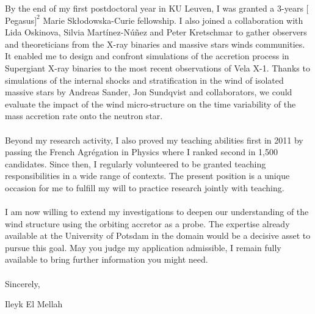 \documentclass[12pt]{letter}
\begin{document}
\begin{letter} {}
\newpage 


\hspace*{0.5cm} By the end of my first postdoctoral year in KU Leuven, I was granted a 3-years $[$Pegasus$]^2$ Marie Sk\l{}odowska-Curie fellowship. I also joined a collaboration with Lida Oskinova, Silvia Mart\'{i}nez-N\'{u}\~{n}ez and Peter Kretschmar to gather observers and theoreticians from the X-ray binaries and massive stars winds communities. It enabled me to design and confront simulations of the accretion process in Supergiant X-ray binaries to the most recent observations of Vela X-1. Thanks to simulations of the internal shocks and stratification in the wind of isolated massive stars by Andreas Sander, Jon Sundqvist and collaborators, we could evaluate the impact of the wind micro-structure on the time variability of the mass accretion rate onto the neutron star.\\ \\
\hspace*{0.5cm} Beyond my research activity, I also proved my teaching abilities first in 2011 by passing the French Agr\'egation in Physics where I ranked second in 1,500 candidates. Since then, I regularly volunteered to be granted teaching responsibilities in a wide range of contexts. The present position is a unique occasion for me to fulfill my will to practice research jointly with teaching.\\ \\
\hspace*{0.5cm} I am now willing to extend my investigations to deepen our understanding of the wind structure using the orbiting accretor as a probe. The expertise already available at the University of Potsdam in the domain would be a decisive asset to pursue this goal. May you judge my application admissible, I remain fully available to bring further information you might need.\\ \\
 
Sincerely,
 
\closing{Ileyk El Mellah} 


  \end{letter}
  
  
 
\end{document}
